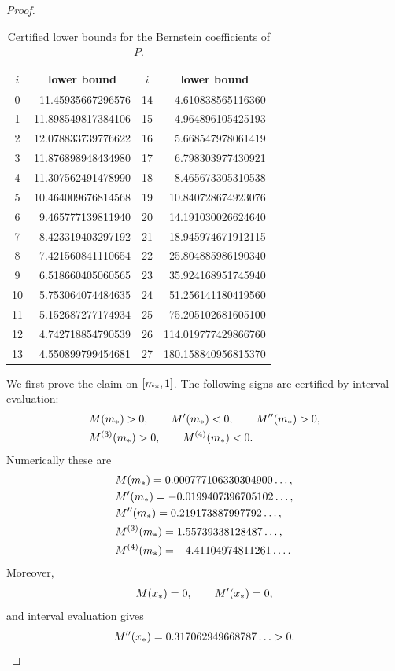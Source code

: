 \begin{proof}
\begin{table}[ht]
\centering
\caption{Certified lower bounds for the Bernstein coefficients of \(P\).}
\label{tab:bernstein}
\begin{tabular}{cr@{\quad}cr}
\toprule
\(i\) & \multicolumn{1}{c}{lower bound} & \(i\) & \multicolumn{1}{c}{lower bound} \\
\midrule
0 & 11.45935667296576 & 14 & 4.610838565116360\\
1 & 11.898549817384106 & 15 & 4.964896105425193\\
2 & 12.078833739776622 & 16 & 5.668547978061419\\
3 & 11.876898948434980 & 17 & 6.798303977430921\\
4 & 11.307562491478990 & 18 & 8.465673305310538\\
5 & 10.464009676814568 & 19 & 10.840728674923076\\
6 & 9.465777139811940 & 20 & 14.191030026624640\\
7 & 8.423319403297192 & 21 & 18.945974671912115\\
8 & 7.421560841110654 & 22 & 25.804885986190340\\
9 & 6.518660405060565 & 23 & 35.924168951745940\\
10 & 5.753064074484635 & 24 & 51.256141180419560\\
11 & 5.152687277174934 & 25 & 75.205102681605100\\
12 & 4.742718854790539 & 26 & 114.019777429866760\\
13 & 4.550899799454681 & 27 & 180.158840956815370\\
\bottomrule
\end{tabular}
\end{table}

We first prove the claim on \([m_*,1]\).  The following signs are certified by interval evaluation:
\begin{align}\label{eq:mstar_signs}
&M(m_*)>0,\qquad M'(m_*)<0,
\qquad M''(m_*)>0,\notag\\
&M^{(3)}(m_*)>0,
\qquad M^{(4)}(m_*)<0.
\end{align}
Numerically these are
\begin{align}\label{eq:mstar_signs_num}
&M(m_*)=0.000777106330304900\ldots,\notag\\
&M'(m_*)=-0.0199407396705102\ldots,\notag\\
&M''(m_*)=0.219173887997792\ldots,\notag\\
&M^{(3)}(m_*)=1.55739338128487\ldots,\notag\\
&M^{(4)}(m_*)=-4.41104974811261\ldots .
\end{align}
Moreover,
\begin{equation}\label{eq:stationary_M}
  M(x_*)=0,
  \qquad
  M'(x_*)=0,
\end{equation}
and interval evaluation gives
\begin{equation}\label{eq:M2xstar}
  M''(x_*)=0.317062949668787\ldots>0.
\end{equation}


\end{proof}

